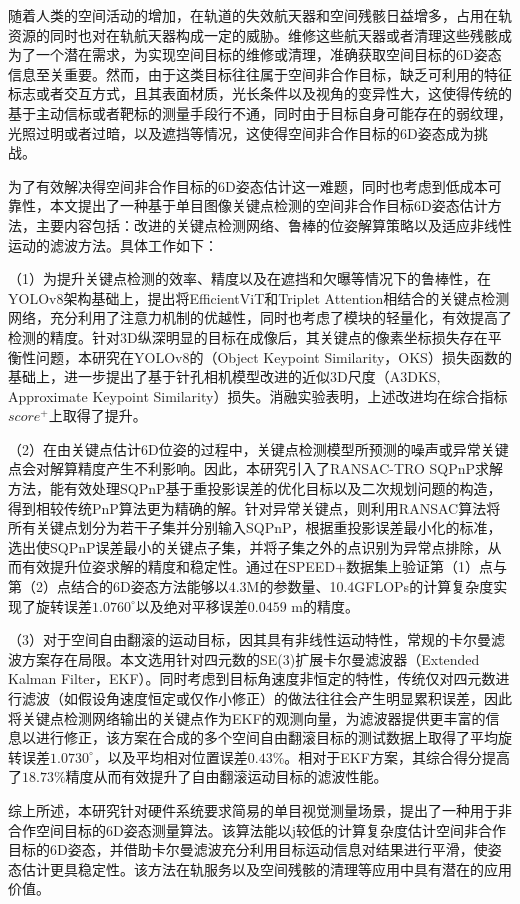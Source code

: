 随着人类的空间活动的增加，在轨道的失效航天器和空间残骸日益增多，占用在轨资源的同时也对在轨航天器构成一定的威胁。维修这些航天器或者清理这些残骸成为了一个潜在需求，为实现空间目标的维修或清理，准确获取空间目标的6D姿态信息至关重要。然而，由于这类目标往往属于空间非合作目标，缺乏可利用的特征标志或者交互方式，且其表面材质，光长条件以及视角的变异性大，这使得传统的基于主动信标或者靶标的测量手段行不通，同时由于目标自身可能存在的弱纹理，光照过明或者过暗，以及遮挡等情况，这使得空间非合作目标的6D姿态成为挑战。

为了有效解决得空间非合作目标的6D姿态估计这一难题，同时也考虑到低成本可靠性，本文提出了一种基于单目图像关键点检测的空间非合作目标6D姿态估计方法，主要内容包括：改进的关键点检测网络、鲁棒的位姿解算策略以及适应非线性运动的滤波方法。具体工作如下：

（1）为提升关键点检测的效率、精度以及在遮挡和欠曝等情况下的鲁棒性，在YOLOv8架构基础上，提出将EfficientViT和Triplet Attention相结合的关键点检测网络，充分利用了注意力机制的优越性，同时也考虑了模块的轻量化，有效提高了检测的精度。针对3D纵深明显的目标在成像后，其关键点的像素坐标损失存在平衡性问题，本研究在YOLOv8的（Object Keypoint Similarity，OKS）损失函数的基础上，进一步提出了基于针孔相机模型改进的近似3D尺度（A3DKS, Approximate Keypoint Similarity）损失。消融实验表明，上述改进均在综合指标$score^+$上取得了提升。

（2）在由关键点估计6D位姿的过程中，关键点检测模型所预测的噪声或异常关键点会对解算精度产生不利影响。因此，本研究引入了RANSAC-TRO SQPnP求解方法，能有效处理SQPnP基于重投影误差的优化目标以及二次规划问题的构造，得到相较传统PnP算法更为精确的解。针对异常关键点，则利用RANSAC算法将所有关键点划分为若干子集并分别输入SQPnP，根据重投影误差最小化的标准，选出使SQPnP误差最小的关键点子集，并将子集之外的点识别为异常点排除，从而有效提升位姿求解的精度和稳定性。通过在SPEED+数据集上验证第（1）点与第（2）点结合的6D姿态方法能够以4.3M的参数量、10.4GFLOPs的计算复杂度实现了旋转误差$1.0760^\circ$以及绝对平移误差$0.0459$ m的精度。

（3）对于空间自由翻滚的运动目标，因其具有非线性运动特性，常规的卡尔曼滤波方案存在局限。本文选用针对四元数的SE(3)扩展卡尔曼滤波器（Extended Kalman Filter，EKF）。同时考虑到目标角速度非恒定的特性，传统仅对四元数进行滤波（如假设角速度恒定或仅作小修正）的做法往往会产生明显累积误差，因此将关键点检测网络输出的关键点作为EKF的观测向量，为滤波器提供更丰富的信息以进行修正，该方案在合成的多个空间自由翻滚目标的测试数据上取得了平均旋转误差$1.0730^\circ$，以及平均相对位置误差$0.43\%$。相对于EKF方案，其综合得分提高了$18.73\%$精度从而有效提升了自由翻滚运动目标的滤波性能。

综上所述，本研究针对硬件系统要求简易的单目视觉测量场景，提出了一种用于非合作空间目标的6D姿态测量算法。该算法能以j较低的计算复杂度估计空间非合作目标的6D姿态，并借助卡尔曼滤波充分利用目标运动信息对结果进行平滑，使姿态估计更具稳定性。该方法在轨服务以及空间残骸的清理等应用中具有潜在的应用价值。
